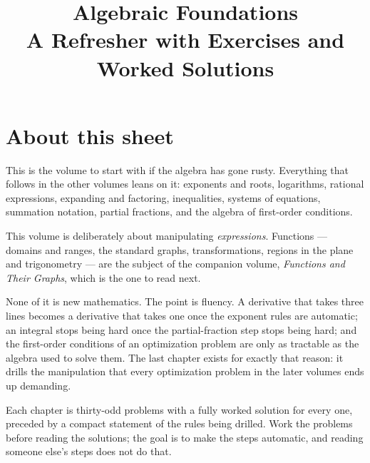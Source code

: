 \documentclass[10pt,oneside]{book}
\title{\Huge Algebraic Foundations\\[0.4em]
  \large A Refresher with Exercises and Worked Solutions}
\author{}
\date{}
\begin{document}
\frontmatter
\maketitle

\chapter*{About this sheet}

This is the volume to start with if the algebra has gone rusty. Everything
that follows in the other volumes leans on it: exponents and roots,
logarithms, rational expressions, expanding and factoring, inequalities,
systems of equations, summation notation, partial fractions, and the
algebra of first-order conditions.

This volume is deliberately about manipulating \emph{expressions}. Functions
--- domains and ranges, the standard graphs, transformations, regions in the
plane and trigonometry --- are the subject of the companion volume,
\emph{Functions and Their Graphs}, which is the one to read next.

None of it is new mathematics. The point is fluency. A derivative that takes
three lines becomes a derivative that takes one once the exponent rules are
automatic; an integral stops being hard once the partial-fraction step
stops being hard; and the first-order conditions of an optimization problem
are only as tractable as the algebra used to solve them. The last chapter
exists for exactly that reason: it drills the manipulation that every
optimization problem in the later volumes ends up demanding.

Each chapter is thirty-odd problems with a fully worked solution for every
one, preceded by a compact statement of the rules being drilled. Work the
problems before reading the solutions; the goal is to make the steps
automatic, and reading someone else's steps does not do that.

\tableofcontents

\mainmatter









\end{document}
